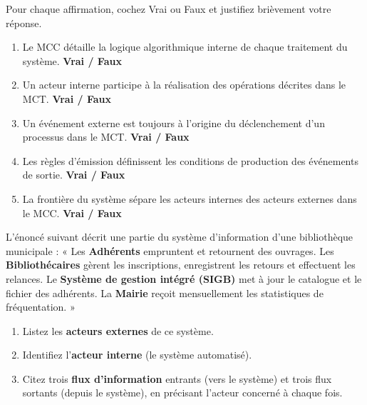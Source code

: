 \documentclass[11pt]{article}
\begin{document}
\begin{exercice}
Pour chaque affirmation, cochez Vrai ou Faux et justifiez brièvement votre réponse.
\begin{enumerate}
    \item Le MCC détaille la logique algorithmique interne de chaque traitement du système. \hfill \textbf{Vrai / Faux}
    \item Un acteur interne participe à la réalisation des opérations décrites dans le MCT. \hfill \textbf{Vrai / Faux}
    \item Un événement externe est toujours à l'origine du déclenchement d'un processus dans le MCT. \hfill \textbf{Vrai / Faux}
    \item Les règles d'émission définissent les conditions de production des événements de sortie. \hfill \textbf{Vrai / Faux}
    \item La frontière du système sépare les acteurs internes des acteurs externes dans le MCC. \hfill \textbf{Vrai / Faux}
\end{enumerate}
\end{exercice}

\begin{exercice}
L'énoncé suivant décrit une partie du système d'information d'une bibliothèque municipale : « Les \textbf{Adhérents} empruntent et retournent des ouvrages. Les \textbf{Bibliothécaires} gèrent les inscriptions, enregistrent les retours et effectuent les relances. Le \textbf{Système de gestion intégré (SIGB)} met à jour le catalogue et le fichier des adhérents. La \textbf{Mairie} reçoit mensuellement les statistiques de fréquentation. »
\begin{enumerate}
    \item Listez les \textbf{acteurs externes} de ce système.
    \item Identifiez l'\textbf{acteur interne} (le système automatisé).
    \item Citez trois \textbf{flux d'information} entrants (vers le système) et trois flux sortants (depuis le système), en précisant l'acteur concerné à chaque fois.
\end{enumerate}
\end{exercice}
\end{document}

